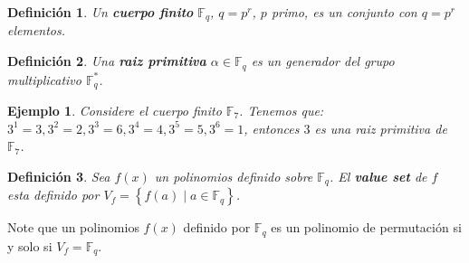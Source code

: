 \documentclass[landscape,final,paperwidth=24in,paperheight=36in]{baposter}
\newtheorem*{ejemplo*}{Ejemplo}
\newtheorem*{definicion*}{Definici\'on}
\begin{document}
\begin{poster}
{\begin{definicion*}
  Un \textbf{cuerpo finito} $\mathbb{F}_{q}$, $q=p^r$, $p$ primo, es un conjunto con $q=p^r$ elementos.
\end{definicion*}

\begin{definicion*}
  Una \textbf{raiz primitiva} $\alpha \in \mathbb{F}_q$ es un generador del grupo multiplicativo $\mathbb{F}_{q}^{*}$.
\end{definicion*}

\begin{ejemplo*}
  Considere el cuerpo finito $\mathbb{F}_{7}$. Tenemos que: $3^1 = 3, 3^2 = 2, 3^3 = 6, 3^4 = 4, 3^5 = 5, 3^6 = 1$, entonces $3$ es una raiz primitiva de $\mathbb{F}_{7}$.
\end{ejemplo*}

\begin{definicion*}
  Sea $f(x)$ un polinomios definido sobre $\mathbb{F}_{q}$. El \textbf{value set} de $f$ esta definido por $V_{f} = \left\{f(a) \mid a \in \mathbb{F}_{q} \right\}$.
\end{definicion*}

Note que un polinomios $f(x)$ definido por $\mathbb{F}_{q}$ es un polinomio de permutaci\'on si y solo si $V_{f} = \mathbb{F}_{q}$.

}\label{Preliminaries}

\label{Applications}

\end{poster}
\end{document}
